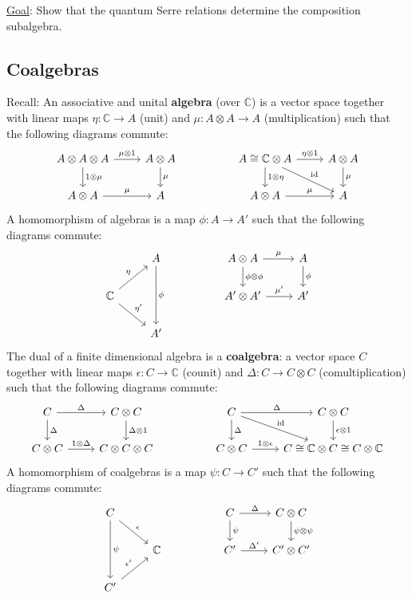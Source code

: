 \documentclass{book}
\newcommand{\id}{\mathrm{id}}
\begin{document}
    \underline{Goal}: Show that the quantum Serre relations determine the composition subalgebra.
    
    \subsection{Coalgebras}
        Recall: An associative and unital \textbf{algebra} (over $\mathbb{C}$) is a vector space together with linear maps $\eta:\mathbb{C}\to A$ (unit) and $\mu:A \otimes A\to A$ (multiplication) such that the following diagrams commute:
        \[\begin{tikzcd}
            A\otimes A\otimes A \arrow{r}{\mu\otimes 1}\arrow{d}{1\otimes\mu} & A\otimes A \arrow{d}{\mu} & & A\cong \mathbb{C}\otimes A \arrow{d}{1\otimes\eta}\arrow{r}{\eta\otimes 1}\arrow{dr}{\id}& A\otimes A \arrow{d}{\mu}
            \\ A\otimes A \arrow{r}{\mu}& A & & A\otimes A\arrow{r}{\mu} & A
        \end{tikzcd}\]
        A homomorphism of algebras is a map $\phi:A\to A'$ such that the following diagrams commute:
        \[\begin{tikzcd}
            &A \arrow{dd}{\phi}
            & & A\otimes A \arrow{d}{\phi\otimes\phi}\arrow{r}{\mu}& A \arrow{d}{\phi}
            \\ \mathbb{C}\arrow{ur}{\eta}\arrow{dr}{\eta'}&
            & & A'\otimes A'\arrow{r}{\mu'} & A'\\
            &A'
        \end{tikzcd}\]
        The dual of a finite dimensional algebra is a \textbf{coalgebra}: a vector space $C$ together with linear maps $\epsilon:C\to\mathbb{C}$ (counit) and $\Delta:C\to C\otimes C$ (comultiplication) such that the following diagrams commute:
        \[\begin{tikzcd}
            C \arrow{r}{\Delta}\arrow{d}{\Delta} & C\otimes C \arrow{d}{\Delta\otimes 1} 
            & & C \arrow{dr}{\id} \arrow{r}{\Delta}\arrow{d}{\Delta} & C\otimes C \arrow{d}{\epsilon\otimes 1}
            \\ C\otimes C \arrow{r}{1\otimes\Delta}& C\otimes C\otimes C 
            & & C\otimes C\arrow{r}{1\otimes\epsilon} & C\cong \mathbb{C}\otimes C\cong C\otimes\mathbb{C}
        \end{tikzcd}\]
        A homomorphism of coalgebras is a map $\psi:C\to C'$ such that the following diagrams commute:
        \[\begin{tikzcd}
            C\arrow{dr}{\epsilon}\arrow{dd}{\psi}& 
            & & C \arrow{d}{\psi}\arrow{r}{\Delta}& C\otimes C \arrow{d}{\psi\otimes\psi}
            \\ &\mathbb{C}
            & & C'\arrow{r}{\Delta'} & C'\otimes C'\\
            C'\arrow{ur}{\epsilon'}&
        \end{tikzcd}\]
        
\end{document}
